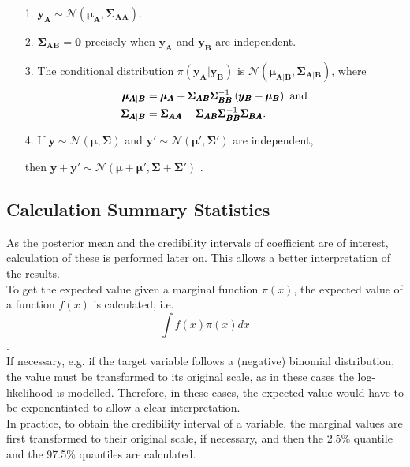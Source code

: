 \begin{itemize}
    \item[1.] $\pmb{y}_{\pmb{A}}\sim\mathcal{N}\left(\pmb{\mu}_{\pmb{A}}, \pmb{\Sigma}_{\pmb{AA}}\right)$.
    \item[2.] $\pmb{\Sigma}_{\pmb{AB}}=\pmb{0}$ precisely when $\pmb{y}_{\pmb{A}}$ and $\pmb{y}_{\pmb{B}}$ are independent.
    \item[3.] The conditional distribution $\pi\left(\pmb{y}_{\pmb{A}}|\pmb{y}_{\pmb{B}}\right)$ is $\mathcal{N}\left(\pmb{\mu}_{\pmb{A}|\pmb{B}}, \pmb{\Sigma}_{\pmb{A}|\pmb{B}}\right)$, where
    \begin{align*}
        \pmb{\mu}_{\pmb{A}|\pmb{B}} &= \pmb{\mu}_{\pmb{A}}+\pmb{\Sigma}_{\pmb{AB}}\pmb{\Sigma}_{\pmb{BB}}^{-1}\left(\pmb{y}_{\pmb{B}}-\pmb{\mu}_{\pmb{B}}\right) \hbox{ and} \\
        \pmb{\Sigma}_{\pmb{A}|\pmb{B}} &= \pmb{\Sigma}_{\pmb{AA}}-\pmb{\Sigma}_{\pmb{AB}}\pmb{\Sigma}_{\pmb{BB}}^{-1}\pmb{\Sigma}_{\pmb{BA}}.
    \end{align*}
    \item[4.] If $\pmb{y}\sim\mathcal{N}\left(\pmb{\mu}, \pmb{\Sigma}\right)$ and $\pmb{y}'\sim\mathcal{N}\left(\pmb{\mu'}, \pmb{\Sigma'}\right)$ are independent, 
    \item[]then $\pmb{y}+\pmb{y'}\sim\mathcal{N}\left(\pmb{\mu}+ \pmb{\mu'}, \pmb{\Sigma}+ \pmb{\Sigma'}\right)$ \autocite[][19--20]{rue2005gaussian}.
\end{itemize}
\subsection{Calculation Summary Statistics}\label{sec:mean_iv}
As the posterior mean and the credibility intervals of coefficient are of interest, calculation of these is performed later on. This allows a better interpretation of the results. \\
To get the expected value given a marginal function $\pi\left(x\right)$, the expected value of a function $f\left(x\right)$ is calculated, i.e.
\begin{equation}
    \int f\left(x\right)\pi\left(x\right)dx
\end{equation}
\autocite[][]{aitkin1991posterior}.\\
If necessary, e.g. if the target variable follows a (negative) binomial distribution, the value must be transformed to its original scale, as in these cases the log-likelihood is modelled. Therefore, in these cases, the expected value would have to be exponentiated to allow a clear interpretation. \\
In practice, to obtain the credibility interval of a variable, the marginal values are first transformed to their original scale, if necessary, and then the 2.5\% quantile and the 97.5\% quantiles are calculated.
